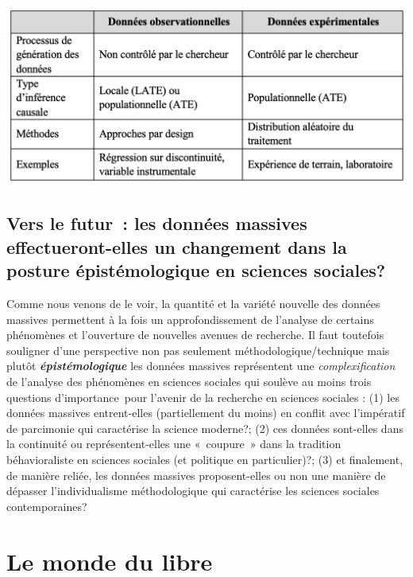 \documentclass[
  letterpaper,
]{scrbook}
\begin{document}
\includegraphics{images/Capture d’écran, le 2023-08-11 à 13.19.08.png}

\hypertarget{vers-le-futur-les-donnuxe9es-massives-effectueront-elles-un-changement-dans-la-posture-uxe9pistuxe9mologique-en-sciences-sociales}{%
\section{Vers le futur~: les données massives effectueront-elles un
changement dans la posture épistémologique en sciences
sociales?}\label{vers-le-futur-les-donnuxe9es-massives-effectueront-elles-un-changement-dans-la-posture-uxe9pistuxe9mologique-en-sciences-sociales}}

Comme nous venons de le voir, la quantité et la variété nouvelle des
données massives permettent à la fois un approfondissement de l'analyse
de certains phénomènes et l'ouverture de nouvelles avenues de recherche.
Il faut toutefois souligner d'une perspective non pas seulement
méthodologique/technique mais plutôt \textbf{\emph{épistémologique}} les
données massives représentent une \emph{complexification} de l'analyse
des phénomènes en sciences sociales qui soulève au moins trois questions
d'importance~pour l'avenir de la recherche en sciences sociales : (1)
les données massives entrent-elles (partiellement du moins) en conflit
avec l'impératif de parcimonie qui caractérise la science moderne?; (2)
ces données sont-elles dans la continuité ou représentent-elles une
«~coupure~» dans la tradition béhavioraliste en sciences sociales (et
politique en particulier)?; (3) et finalement, de manière reliée, les
données massives proposent-elles ou non une manière de dépasser
l'individualisme méthodologique qui caractérise les sciences sociales
contemporaines?


\hypertarget{le-monde-du-libre}{%
\chapter{Le monde du libre}\label{le-monde-du-libre}}
\end{document}
